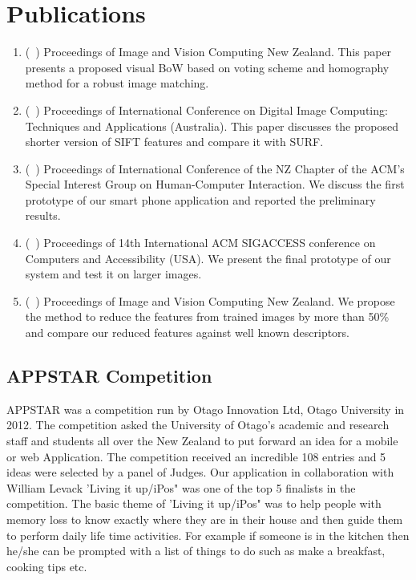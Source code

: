 \section{Publications}
\label{sec:publicatios}

\begin{enumerate}
\item (~\cite{khan11a}) Proceedings of Image and Vision Computing New Zealand. 
This paper presents a proposed visual BoW 
based on voting scheme and homography method for a 
robust image matching.

\item (~\cite{khan11b})  Proceedings of International 
Conference on Digital Image Computing: 
Techniques and Applications (Australia). This paper discusses the proposed 
shorter version of SIFT features and compare it with SURF.

\item (~\cite{khan12a}) Proceedings of International 
Conference of the NZ Chapter of the 
ACM's Special Interest Group on Human-Computer Interaction. 
We discuss the first prototype of our smart phone application 
and reported the preliminary results. 

\item (~\cite{khan12b}) Proceedings of 14th International 
ACM SIGACCESS conference on Computers and Accessibility (USA).
We present the final prototype of our system 
and test it on larger images. 


\item  (~\cite{khan12c}) 
Proceedings of Image and Vision Computing New Zealand.
We propose the method to reduce the features from 
trained images by more than 50\% and compare 
our reduced features against well known descriptors.

\end{enumerate}
\subsection{APPSTAR Competition}
APPSTAR was a competition run by Otago Innovation Ltd, Otago University in 
2012. The competition asked the University of Otago’s academic and research 
staff and students all over the New Zealand 
to put forward an idea for a mobile or web Application. 
The competition received an incredible 108 entries and 
5 ideas were selected by a panel of Judges.
Our application in collaboration with William Levack 
'Living it up/iPos" was one of the top 5 finalists in the competition. 
The basic theme of 'Living it up/iPos" was 
to help people with memory loss to know exactly 
where they are in their house and then 
guide them to perform daily life time activities. 
For example if someone is in the kitchen 
then he/she can be prompted with a 
list of things to do such as make a breakfast, 
cooking tips etc.
 

